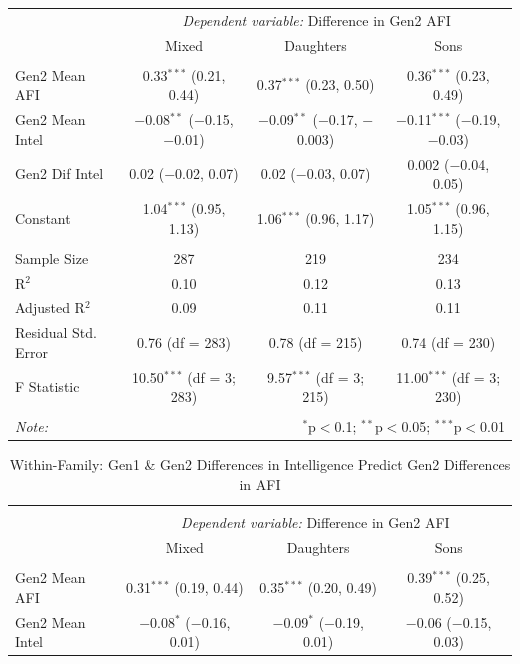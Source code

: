 \documentclass[a4paper,man,apacite,natbib,12pt,longtable]{apa6}\usepackage[]{graphicx}\usepackage[]{color}
\begin{document}
\begin{landscape}
\begin{longtable}{@{\extracolsep{5pt}}lccc}
  & \multicolumn{3}{c}{\textit{Dependent variable:} Difference in Gen2 AFI} \\ 
  \cline{2-4}
 & Mixed & Daughters & Sons \\ 
\hline \\[-1.8ex] 
 Gen2 Mean AFI & 0.33$^{***}$ (0.21, 0.44) & 0.37$^{***}$ (0.23, 0.50) & 0.36$^{***}$ (0.23, 0.49) \\ 
  Gen2 Mean Intel & $-$0.08$^{**}$ ($-$0.15, $-$0.01) & $-$0.09$^{**}$ ($-$0.17, $-$0.003) & $-$0.11$^{***}$ ($-$0.19, $-$0.03) \\ 
  Gen2 Dif Intel & 0.02 ($-$0.02, 0.07) & 0.02 ($-$0.03, 0.07) & 0.002 ($-$0.04, 0.05) \\ 
  Constant & 1.04$^{***}$ (0.95, 1.13) & 1.06$^{***}$ (0.96, 1.17) & 1.05$^{***}$ (0.96, 1.15) \\ 
 \hline \\[-1.8ex] 
Sample Size & 287 & 219 & 234 \\ 
R$^{2}$ & 0.10 & 0.12 & 0.13 \\ 
Adjusted R$^{2}$ & 0.09 & 0.11 & 0.11 \\ 
Residual Std. Error & 0.76 (df = 283) & 0.78 (df = 215) & 0.74 (df = 230) \\ 
F Statistic & 10.50$^{***}$ (df = 3; 283) & 9.57$^{***}$ (df = 3; 215) & 11.00$^{***}$ (df = 3; 230) \\ 
\hline 
\hline \\[-1.8ex] 
\textit{Note:}  & \multicolumn{3}{r}{$^{*}$p$<$0.1; $^{**}$p$<$0.05; $^{***}$p$<$0.01} \\ 
  \end{longtable}\pagebreak
  \begin{longtable}{@{\extracolsep{5pt}}lccc} 
  \caption{Within-Family: Gen1 \& Gen2 Differences in Intelligence Predict Gen2 Differences in AFI} \label{table_Dif_Joint_Intelligence_Dif_Child_AFI_10}
  \\[-1.8ex]\hline 
  \hline \\[-3.8ex] 
  & \multicolumn{3}{c}{\textit{Dependent variable:} Difference in Gen2 AFI} \\ 
  \cline{2-4}
 & Mixed & Daughters & Sons \\ 
\hline \\[-1.8ex] 
 Gen2 Mean AFI & 0.31$^{***}$ (0.19, 0.44) & 0.35$^{***}$ (0.20, 0.49) & 0.39$^{***}$ (0.25, 0.52) \\ 
  Gen2 Mean Intel & $-$0.08$^{*}$ ($-$0.16, 0.01) & $-$0.09$^{*}$ ($-$0.19, 0.01) & $-$0.06 ($-$0.15, 0.03) \\ 

\end{longtable}
\end{landscape}
\end{document}
